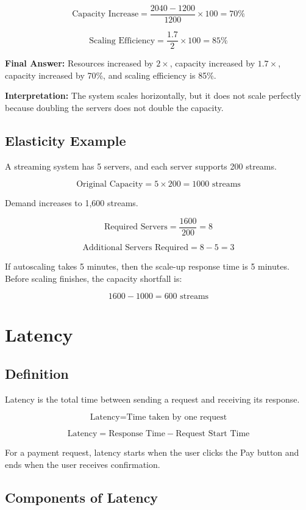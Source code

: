 \documentclass[11pt]{article}
\begin{document}
\[
\text{Capacity Increase}
=
\frac{2040 - 1200}{1200}
\times 100
=
70\%
\]

\[
\text{Scaling Efficiency}
=
\frac{1.7}{2}
\times 100
=
85\%
\]

\textbf{Final Answer:} Resources increased by $2\times$, capacity increased by $1.7\times$, capacity increased by 70\%, and scaling efficiency is 85\%.

\textbf{Interpretation:} The system scales horizontally, but it does not scale perfectly because doubling the servers does not double the capacity.

\subsection*{Elasticity Example}

A streaming system has 5 servers, and each server supports 200 streams.

\[
\text{Original Capacity}
=
5 \times 200
=
1000 \text{ streams}
\]

Demand increases to 1,600 streams.

\[
\text{Required Servers}
=
\frac{1600}{200}
=
8
\]

\[
\text{Additional Servers Required}
=
8 - 5
=
3
\]

If autoscaling takes 5 minutes, then the scale-up response time is 5 minutes. Before scaling finishes, the capacity shortfall is:

\[
1600 - 1000 = 600 \text{ streams}
\]

\section{Latency}

\subsection*{Definition}

Latency is the total time between sending a request and receiving its response.

\[
\boxed{\text{Latency} = \text{Time taken by one request}}
\]

\[
\text{Latency}
=
\text{Response Time}
-
\text{Request Start Time}
\]

For a payment request, latency starts when the user clicks the Pay button and ends when the user receives confirmation.

\subsection*{Components of Latency}
\end{document}

